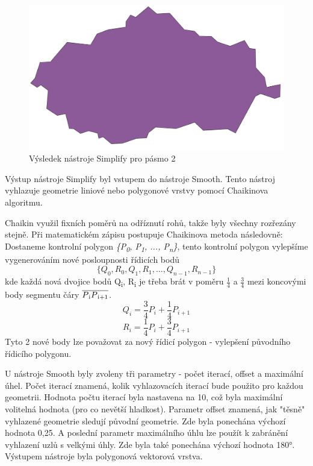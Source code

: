 \begin{figure}[H] \centering
    \includegraphics[width=400pt]{./pictures/simplify.png}
    \caption[Výsledek nástroje Simplify pro pásmo 2]{Výsledek nástroje Simplify pro pásmo 2}
	\label{fig:simplify}                                
\end{figure}

Výstup nástroje Simplify byl vstupem do nástroje Smooth. Tento nástroj vyhlazuje geometrie
liniové nebo polygonové vrstvy pomocí Chaikinova algoritmu.

Chaikin využil fixních poměrů na odříznutí rohů, takže byly všechny rozřezány stejně. 
Při matematickém zápisu postupuje Chaikinova metoda následovně: Dostaneme kontrolní polygon 
\textit{\{P\textsubscript{0}, P\textsubscript{1}, ..., P\textsubscript{n}\}},
tento kontrolní polygon vylepšíme vygenerováním nové posloupnosti řídicích bodů 
\[ \{Q_0, R_0, Q_1, R_1, ...,  Q_{n−1}, R_{n−1}\} \]                                    
kde každá nová dvojice bodů Q\textsubscript{i}, R\textsubscript{i} je třeba brát v poměru \(\frac{1}{4}\)
a \(\frac{3}{4}\) mezi koncovými body segmentu čáry \(\overline{P\textsubscript{i}P\textsubscript{i+1}}\).
\[Q_i = \frac{3}{4}P_i + \frac{1}{4}P_{i+1}\]
\[R_i = \frac{1}{4}P_i + \frac{3}{4}P_{i+1}\]
Tyto 2 nové body lze považovat za nový řídicí polygon - vylepšení původního řídicího polygonu. \cite{chaikin} 

U nástroje Smooth byly zvoleny tři parametry - počet iterací, offset a maximální úhel.
Počet iterací znamená, kolik vyhlazovacích iterací bude použito pro každou geometrii.
Hodnota počtu iterací byla nastavena na 10, což byla maximální volitelná hodnota (pro co nevětší hladkost).
Parametr offset znamená, jak "těsně" vyhlazené geometrie sledují původní geometrie.
Zde byla ponechána výchozí hodnota 0,25. A poslední parametr maximálního úhlu lze použít
k zabránění vyhlazení uzlů s velkými úhly. Zde byla také ponechána výchozí hodnota 180°.
Výstupem nástroje byla polygonová vektorová vrstva.

